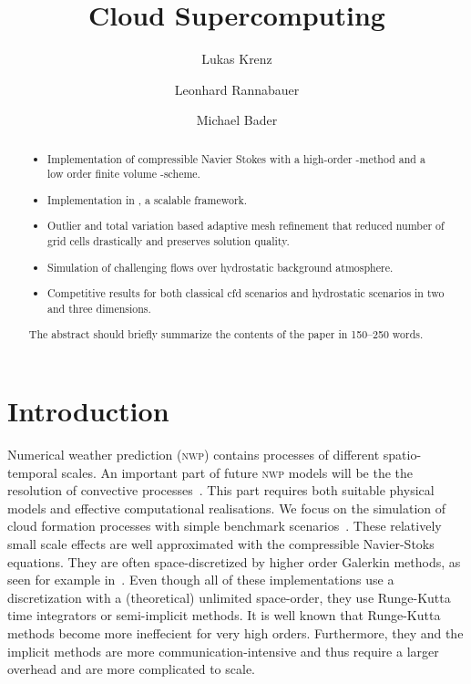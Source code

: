 \documentclass[runningheads]{llncs}
\title{Cloud Supercomputing}
\author{Lukas Krenz\inst{1} \and{} Leonhard Rannabauer\inst{1} \and{} Michael Bader\inst{1}}
\institute{Technical University of Munich} %
\begin{document}
\maketitle
\begin{abstract}

\begin{itemize}
\item Implementation of compressible Navier Stokes with a high-order \aderdg{}-method and a low order finite volume \muscl{}-scheme.
\item Implementation in \exahypeengine{}, a scalable \pde{} framework.
\item Outlier and total variation based adaptive mesh refinement that reduced number of grid cells drastically and preserves solution quality.
\item Simulation of challenging flows over hydrostatic background atmosphere.
\item Competitive results for both classical cfd scenarios and hydrostatic scenarios in two and three dimensions.
\end{itemize}
  
The abstract should briefly summarize the contents of the paper in
150--250 words.

\end{abstract}
\section{Introduction}
Numerical weather prediction (\textsc{nwp}) contains processes of different spatio-temporal scales.
An important part of future \textsc{nwp} models will be the the resolution of convective processes~\cite{bauer2015quiet}.
This part requires both suitable physical models and effective computational realisations. 
We focus on the simulation of cloud formation processes with simple benchmark scenarios~\cite{giraldo2008study}.
These relatively small scale effects are well approximated with the compressible Navier-Stoks equations.
They are often space-discretized by higher order Galerkin methods, as seen for example in~\cite{giraldo2008study,muller2010adaptive,muller2018strong}.
Even though all of these implementations use a discretization with a (theoretical) unlimited space-order, they use Runge-Kutta time integrators or semi-implicit methods.
It is well known that Runge-Kutta methods become more ineffecient for very high orders.
Furthermore, they and the implicit methods are more communication-intensive and thus require a larger overhead and are more complicated to scale.
\end{document}
